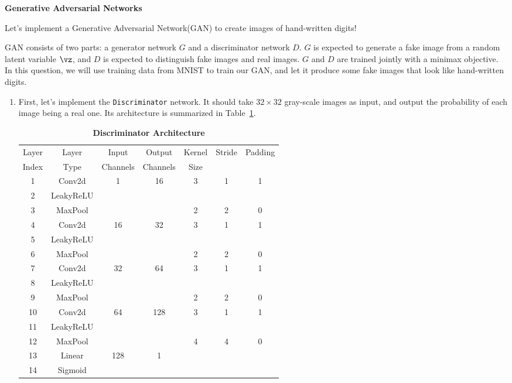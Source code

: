 \begin{Q}
\textbf{\Large Generative Adversarial Networks}

Let's implement a Generative Adversarial Network(GAN) to create images of hand-written digits!

GAN consists of two parts: a generator network $G$ and a discriminator network $D$. $G$ is expected to generate a fake image from a random latent variable $\vz$, and $D$ is expected to distinguish fake images and real images. $G$ and $D$ are trained jointly with a minimax objective. In this question, we will use training data from MNIST to train our GAN, and let it produce some fake images that look like hand-written digits.

\begin{enumerate}
    \item First, let's implement the \texttt{Discriminator} network. It should take $32\times 32$ gray-scale images as input, and output the probability of each image being a real one. Its architecture is summarized in Table~\ref{table:D}.
    \begin{table}[H]
    \begin{center}
    \caption{\textbf{Discriminator Architecture}}
    \label{table:D}
    \begin{tabular}{ccccccc}
    \toprule
    Layer & Layer & Input & Output & Kernel & Stride & Padding \\
    Index & Type & Channels & Channels & Size & & \\
    \midrule
    1 & Conv2d & 1 & 16 & 3 & 1 & 1 \\
    2 & LeakyReLU \\
    3 & MaxPool & & & 2 & 2 & 0 \\
    \midrule
    4 & Conv2d & 16 & 32 & 3 & 1 & 1 \\
    5 & LeakyReLU \\
    6 & MaxPool & & & 2 & 2 & 0 \\
    \midrule
    7 & Conv2d & 32 & 64 & 3 & 1 & 1 \\
    8 & LeakyReLU \\
    9 & MaxPool & & & 2 & 2 & 0 \\
    \midrule
    10 & Conv2d & 64 & 128 & 3 & 1 & 1 \\
    11 & LeakyReLU \\
    12 & MaxPool & & & 4 & 4 & 0 \\
    \midrule
    13 & Linear & 128 & 1 \\
    14 & Sigmoid \\

\end{tabular}
\end{center}
\end{table}
\end{enumerate}
\end{Q}
